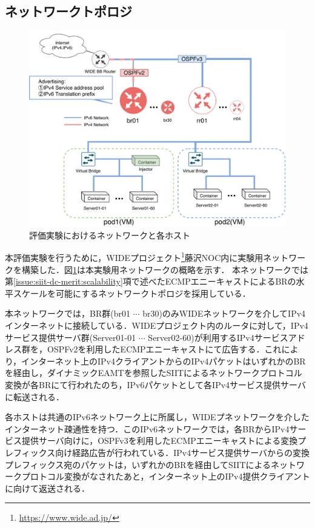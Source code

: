 \subsection{ネットワークトポロジ}
\begin{figure}[H]
    \begin{center}
    \includegraphics[width=15cm,pagebox=cropbox,clip]{img/evaluation_experiment.pdf}
    \end{center}
    \caption{評価実験におけるネットワークと各ホスト}
    \label{fig:evaluation_experiment}
\end{figure}

本評価実験を行うために，WIDEプロジェクト\footnote{\url{https://www.wide.ad.jp/}}藤沢NOC内に実験用ネットワークを構築した．図\ref{fig:evaluation_experiment}は本実験用ネットワークの概略を示す．
本ネットワークでは第\ref{issue:siit-dc-merit:scalability}項で述べたECMPエニーキャストによるBRの水平スケールを可能にするネットワークトポロジを採用している．


本ネットワークでは，BR群(br01 $\cdots$ br30)のみWIDEネットワークを介してIPv4インターネットに接続している．WIDEプロジェクト内のルータに対して，IPv4サービス提供サーバ群(Server01-01  $\cdots$ Server02-60)が利用するIPv4サービスアドレス群を，OSPFv2\cite{RFC2328}を利用したECMPエニーキャストにて広告する．これにより，インターネット上のIPv4クライアントからのIPv4パケットはいずれかのBRを経由し，ダイナミックEAMTを参照したSIITによるネットワークプロトコル変換が各BRにて行われたのち，IPv6パケットとして各IPv4サービス提供サーバに転送される．

各ホストは共通のIPv6ネットワーク上に所属し，WIDEプネットワークを介したインターネット疎通性を持つ．このIPv6ネットワークでは，各BRからIPv4サービス提供サーバ向けに，OSPFv3\cite{RFC5340}を利用したECMPエニーキャストによる変換プレフィックス向け経路広告が行われている．IPv4サービス提供サーバからの変換プレフィックス宛のパケットは，いずれかのBRを経由してSIITによるネットワークプロトコル変換がなされたあと，インターネット上のIPv4提供クライアントに向けて返送される．

